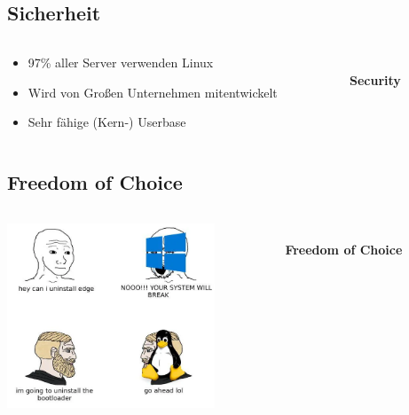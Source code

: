 \documentclass[
    ngerman,
    accentcolor=3b,
    fontsize= 12pt,
    a4paper,
    aspectratio=169,
    colorback=true,
    fancy_row_colors,
    leqno,
    fleqn,
    boxarc=3pt,
    fleqn,
    main,
    design=2008,
]{algoslides}
\begin{document}
    \subsection{Sicherheit}
    \begin{frame}[c]
        \slidehead{}
        \begin{columns}
            \begin{column}[c]{0.5\textwidth}
                \begin{itemize}
                    \item 97\% aller Server verwenden Linux
                    \item Wird von Großen Unternehmen mitentwickelt
                    \item Sehr fähige (Kern-) Userbase
                \end{itemize}
            \end{column}
            \begin{column}[c]{0.5\textwidth}
                \begin{center}
                    \fontsize{50pt}{0pt}\selectfont\faShield*{}\\[0.2cm]
                    \normalsize\textbf{Security}
                \end{center}
            \end{column}
        \end{columns}
    \end{frame}
    \subsection{Freedom of Choice}
    \begin{frame}[c]%
        \slidehead{}%
        \begin{columns}%
            \begin{column}[c]{0.5\textwidth}%
                \centering\includegraphics[height=5.5cm]{freedom_of_choice_meme.png}%
            \end{column}%
            \begin{column}[c]{0.5\textwidth}
                \begin{center}
                    \fontsize{50pt}{0pt}\selectfont\faMagic{}\\[0.2cm]
                    \normalsize\textbf{Freedom of Choice}
                \end{center}
            \end{column}
        \end{columns}
    \end{frame}
\end{document}
